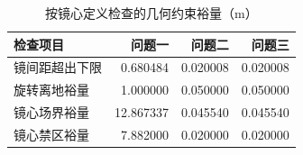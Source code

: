 \begin{table}[H]\centering\small
\caption{按镜心定义检查的几何约束裕量（m）}\label{tab:constraints}
\begin{tabular}{lrrr}\toprule
检查项目 & 问题一 & 问题二 & 问题三\\\midrule
镜间距超出下限 & 0.680484 & 0.020008 & 0.020008\\
旋转离地裕量 & 1.000000 & 0.050000 & 0.050000\\
镜心场界裕量 & 12.867337 & 0.045540 & 0.045540\\
镜心禁区裕量 & 7.882000 & 0.020000 & 0.020000\\
\bottomrule\end{tabular}
\end{table}
